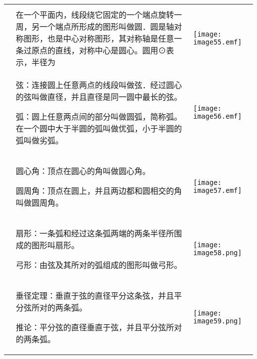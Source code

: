 \begin{longtable}[]{@{}lll@{}}
\toprule
\endhead
& &\tabularnewline
&
在一个平面内，线段绕它固定的一个端点旋转一周，另一个端点所形成的图形叫做圆．圆是轴对称图形，也是中心对称图形，其对称轴是任意一条过原点的直线，对称中心是圆心。圆用⊙表示，半径为
&
\texttt{[image: image55.emf]}\tabularnewline
\begin{minipage}[t]{0.30\columnwidth}\raggedright
\strut
\end{minipage} & \begin{minipage}[t]{0.30\columnwidth}\raggedright
弦：连接圆上任意两点的线段叫做弦．经过圆心的弦叫做直径，并且直径是同一圆中最长的弦。

弧：圆上任意两点间的部分叫做圆弧，简称弧。在一个圆中大于半圆的弧叫做优弧，小于半圆的弧叫做劣弧。\strut
\end{minipage} & \begin{minipage}[t]{0.30\columnwidth}\raggedright
\texttt{[image: image56.emf]}\strut
\end{minipage}\tabularnewline
\begin{minipage}[t]{0.30\columnwidth}\raggedright
\strut
\end{minipage} & \begin{minipage}[t]{0.30\columnwidth}\raggedright
圆心角：顶点在圆心的角叫做圆心角。

圆周角：顶点在圆上，并且两边都和圆相交的角叫做圆周角。\strut
\end{minipage} & \begin{minipage}[t]{0.30\columnwidth}\raggedright
\texttt{[image: image57.emf]}\strut
\end{minipage}\tabularnewline
\begin{minipage}[t]{0.30\columnwidth}\raggedright
\strut
\end{minipage} & \begin{minipage}[t]{0.30\columnwidth}\raggedright
扇形：一条弧和经过这条弧两端的两条半径所围成的图形叫扇形。

弓形：由弦及其所对的弧组成的图形叫做弓形。\strut
\end{minipage} & \begin{minipage}[t]{0.30\columnwidth}\raggedright
\texttt{[image: image58.png]}\strut
\end{minipage}\tabularnewline
\begin{minipage}[t]{0.30\columnwidth}\raggedright
\strut
\end{minipage} & \begin{minipage}[t]{0.30\columnwidth}\raggedright
垂径定理：垂直于弦的直径平分这条弦，并且平分弦所对的两条弧。

推论：平分弦的直径垂直于弦，并且平分弦所对的两条弧。\strut
\end{minipage} & \begin{minipage}[t]{0.30\columnwidth}\raggedright
\texttt{[image: image59.png]}\strut
\end{minipage}\tabularnewline
\bottomrule
\end{longtable}

